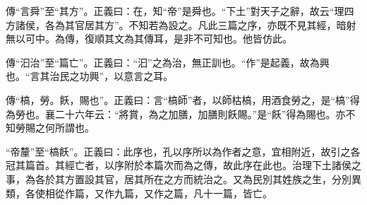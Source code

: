 {\noindent\zhuan{}\fzbyks 傳“言舜”至“其方”。正義曰：在，知“帝”是舜也。“下土”對天子之辭，故云“理四方諸侯，各為其官居其方”。不知若為設之。凡此三篇之序，亦既不見其經，暗射無以可中。為傳，復順其文為其傳耳，是非不可知也。他皆仿此。 \par}

{\noindent\zhuan{}\fzbyks 傳“汩治”至“篇亡”。正義曰：“汩”之為治，無正訓也。“作”是起義，故為興也。“言其治民之功興”，以意言之耳。 \par}

{\noindent\zhuan{}\fzbyks 傳“槁，勞。飫，賜也”。正義曰：言“槁師”者，以師枯槁，用酒食勞之，是“槁”得為勞也。襄二十六年云：“將賞，為之加膳，加膳則飫賜。”是“飫”得為賜也。亦不知勞賜之何所謂也。 \par}

{\noindent\shu{}\fzkt “帝釐”至“槁飫”。正義曰：此序也，孔以序所以為作者之意，宜相附近，故引之各冠其篇首。其經亡者，以序附於本篇次而為之傳，故此序在此也。治理下土諸侯之事，為各於其方置設其官，居其所在之方而統治之。又為民別其姓族之生，分別異類，各使相從作篇，又作九篇，又作之篇，凡十一篇，皆亡。 \par}

